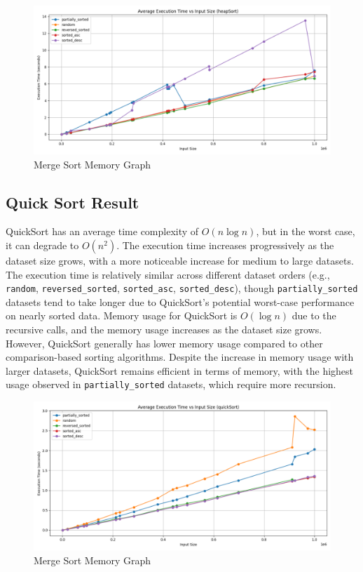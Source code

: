 \documentclass[sigconf]{acmart}
\begin{document}
\begin{figure}[H]
\centering
\includegraphics[width=0.85\linewidth]{figures/heapTime.pdf}
\vspace{-0.3cm}
\caption{Merge Sort Memory Graph}  
\vspace{-0.35cm}
\label{fig:proportion}
\end{figure}

\subsection{Quick Sort Result}
QuickSort has an average time complexity of $O(n \log n)$, but in the worst case, it can degrade to $O(n^2)$. The execution time increases progressively as the dataset size grows, with a more noticeable increase for medium to large datasets. The execution time is relatively similar across different dataset orders (e.g., \texttt{random}, \texttt{reversed\_sorted}, \texttt{sorted\_asc}, \texttt{sorted\_desc}), though \texttt{partially\_sorted} datasets tend to take longer due to QuickSort's potential worst-case performance on nearly sorted data. Memory usage for QuickSort is $O(\log n)$ due to the recursive calls, and the memory usage increases as the dataset size grows. However, QuickSort generally has lower memory usage compared to other comparison-based sorting algorithms. Despite the increase in memory usage with larger datasets, QuickSort remains efficient in terms of memory, with the highest usage observed in \texttt{partially\_sorted} datasets, which require more recursion.

\begin{figure}[H]
\centering
\includegraphics[width=0.85\linewidth]{figures/quickTime.pdf}
\vspace{-0.3cm}
\caption{Merge Sort Memory Graph}  
\vspace{-0.35cm}
\label{fig:proportion}
\end{figure}






% 
% 
\end{document}
